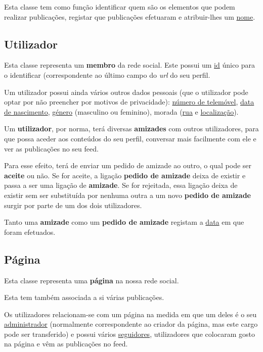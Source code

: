 \documentclass{report}
\begin{document}
Esta classe tem como função identificar quem são os elementos que podem realizar publicações, registar que publicações efetuaram e atribuir-lhes um \underline{nome}.

\subsection{Utilizador}

Esta classe representa um \textbf{membro} da rede social. Este possui um \underline{id} único para o identificar (correspondente ao último campo do \textit{url} do seu perfil. \par

Um utilizador possui ainda vários outros dados pessoais (que o utilizador pode optar por não preencher por motivos de privacidade): \underline{número de telemóvel}, \underline{data de nascimento}, \underline{género} (masculino ou feminino), morada (\underline{rua} e \underline{localização}). \par

Um \textbf{utilizador}, por norma, terá diversas \textbf{amizades} com outros utilizadores, para que possa aceder aos conteúdos do seu perfil, conversar mais facilmente com ele e ver as publicações no seu feed.\par

Para esse efeito, terá de enviar um pedido de amizade ao outro, o qual pode ser \textbf{aceite} ou não. Se for aceite, a ligação \textbf{pedido de amizade} deixa de existir e passa a ser uma ligação de \textbf{amizade}. Se for rejeitada, essa ligação deixa de existir sem ser substituída por nenhuma outra a um novo \textbf{pedido de amizade} surgir por parte de um dos dois utilizadores.

Tanto uma \textbf{amizade} como um \textbf{pedido de amizade} registam a \underline{data} em que foram efetuados.

\subsection{Página}

Esta classe representa uma \textbf{página} na nossa rede social. \par

Esta tem também associada a si várias publicações. \par

Os utilizadores relacionam-se com um página na medida em que um deles é o seu \underline{administrador} (normalmente correspondente ao criador da página, mas este cargo pode ser transferido) e possui vários \underline{seguidores}, utilizadores que colocaram gosto na página e vêm as publicações no feed.
\end{document}
